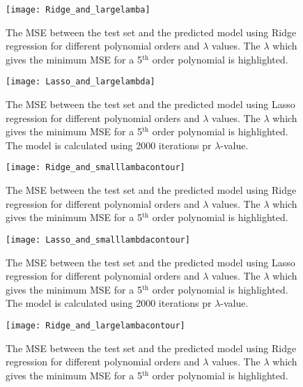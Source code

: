 \documentclass[uio,jmp,amsmath,amssymb,reprint,nofootinbib]{revtex4-1}
\numberwithin{equation}{section}
\begin{document}
\begin{figure}[H]
    \centering
    \texttt{[image: Ridge\_and\_largelamba]}
    \caption{The MSE between the test set and the predicted model using Ridge regression for different polynomial orders and \(\lambda\) values. The \(\lambda\) which gives the minimum MSE for a 5\(^\text{th}\) order polynomial is highlighted.}
    \label{fig:Vary_lambda_R2}
\end{figure}

\begin{figure}[H]
    \centering
    \texttt{[image: Lasso\_and\_largelambda]}
    \caption{The MSE between the test set and the predicted model using Lasso regression for different polynomial orders and \(\lambda\) values. The \(\lambda\) which gives the minimum MSE for a 5\(^\text{th}\) order polynomial is highlighted. The model is calculated using 2000 iterations pr \(\lambda\)-value.}
    \label{fig:Vary_lambda_L2}
\end{figure}

\begin{figure}[H]
    \centering
    \texttt{[image: Ridge\_and\_smalllambacontour]}
    \caption{The MSE between the test set and the predicted model using Ridge regression for different polynomial orders and \(\lambda\) values. The \(\lambda\) which gives the minimum MSE for a 5\(^\text{th}\) order polynomial is highlighted.}
    \label{fig:Vary_lambda_R3}
\end{figure}

\begin{figure}[H]
    \centering
    \texttt{[image: Lasso\_and\_smalllambdacontour]}
    \caption{The MSE between the test set and the predicted model using Lasso regression for different polynomial orders and \(\lambda\) values. The \(\lambda\) which gives the minimum MSE for a 5\(^\text{th}\) order polynomial is highlighted. The model is calculated using 2000 iterations pr \(\lambda\)-value.}
    \label{fig:Vary_lambda_L3}
\end{figure}

\begin{figure}[H]
    \centering
    \texttt{[image: Ridge\_and\_largelambacontour]}
    \caption{The MSE between the test set and the predicted model using Ridge regression for different polynomial orders and \(\lambda\) values. The \(\lambda\) which gives the minimum MSE for a 5\(^\text{th}\) order polynomial is highlighted.}
    \label{fig:Vary_lambda_R4}
\end{figure}
\end{document}
